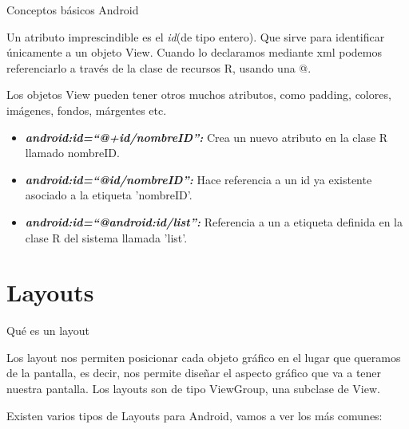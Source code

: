 \begin{frame}{Conceptos básicos Android}
    \begin{block}{}
    Un atributo imprescindible es el \textit{{id}}(de tipo entero). Que sirve para identificar únicamente a un objeto View. Cuando lo declaramos mediante xml podemos referenciarlo a través de la clase de recursos R, usando una @.

    Los objetos View pueden tener otros muchos atributos, como padding, colores, imágenes, fondos, márgentes etc.
        \begin{itemize}
                \item \textit{\textbf{android:id=“@+id/nombreID”:}}
                Crea un nuevo atributo en la clase R llamado nombreID.\pause
                \item <2-> \textit{\textbf{android:id=“@id/nombreID”:}}
                Hace referencia a un id ya existente asociado a la etiqueta 'nombreID'.
                \item <3-> \textit{\textbf{android:id=“@android:id/list”:}}
                Referencia a un a etiqueta definida en la clase R del sistema llamada 'list'.
        \end{itemize}
    \end{block}
\end{frame}

\section{Layouts}

\begin{frame}{Qué es un layout}
    \begin{block}{}
Los layout nos permiten posicionar cada objeto gráfico en el lugar que queramos de la pantalla, es decir, nos permite diseñar el aspecto gráfico que va a tener nuestra pantalla. Los layouts son de tipo ViewGroup, una subclase de View.

Existen varios tipos de Layouts para Android, vamos a ver los más comunes:
    \end{block}
\end{frame}

